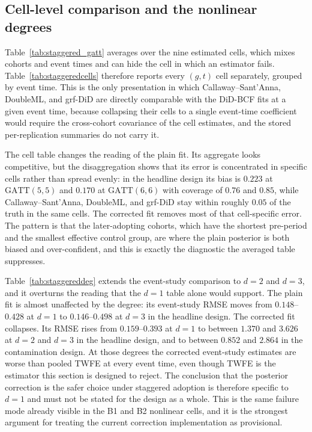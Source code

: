 \documentclass[11pt]{article}
\newcommand{\gatt}{\mathrm{GATT}}
\begin{document}




\subsection{Cell-level comparison and the nonlinear degrees}

Table~\ref{tab:staggered_gatt} averages over the nine estimated cells, which
mixes cohorts and event times and can hide the cell in which an estimator
fails. Table~\ref{tab:staggeredcells} therefore reports every $(g,t)$ cell
separately, grouped by event time. This is the only presentation in which
Callaway--Sant'Anna, DoubleML, and grf-DiD are directly comparable with the
DiD-BCF fits at a given event time, because collapsing their cells to a single
event-time coefficient would require the cross-cohort covariance of the cell
estimates, and the stored per-replication summaries do not carry it.

The cell table changes the reading of the plain fit. Its aggregate looks
competitive, but the disaggregation shows that its error is concentrated in
specific cells rather than spread evenly: in the headline design its bias is
$0.223$ at $\gatt(5,5)$ and $0.170$ at $\gatt(6,6)$ with coverage of $0.76$
and $0.85$, while Callaway--Sant'Anna, DoubleML, and grf-DiD stay within
roughly $0.05$ of the truth in the same cells. The corrected fit removes most
of that cell-specific error. The pattern is that the later-adopting cohorts,
which have the shortest pre-period and the smallest effective control group,
are where the plain posterior is both biased and over-confident, and this is
exactly the diagnostic the averaged table suppresses.

Table~\ref{tab:staggereddeg} extends the event-study comparison to $d=2$ and
$d=3$, and it overturns the reading that the $d=1$ table alone would support.
The plain fit is almost unaffected by the degree: its event-study RMSE moves
from $0.148$--$0.428$ at $d=1$ to $0.146$--$0.498$ at $d=3$ in the headline
design. The corrected fit collapses. Its RMSE rises from $0.159$--$0.393$ at
$d=1$ to between $1.370$ and $3.626$ at $d=2$ and $d=3$ in the headline
design, and to between $0.852$ and $2.864$ in the contamination design. At
those degrees the corrected event-study estimates are worse than pooled TWFE
at every event time, even though TWFE is the estimator this section is
designed to reject. The conclusion that the posterior correction is the safer
choice under staggered adoption is therefore specific to $d=1$ and must not be
stated for the design as a whole. This is the same failure mode already visible
in the B1 and B2 nonlinear cells, and it is the strongest argument for treating
the current correction implementation as provisional.
\end{document}
